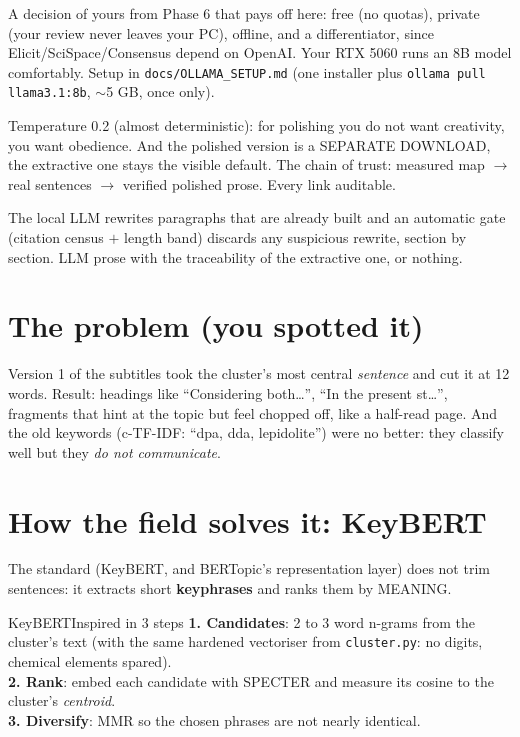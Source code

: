 \documentclass[11pt,a4paper]{article}
\begin{document}
A decision of yours from Phase 6 that pays off here: free (no quotas), private (your review
never leaves your PC), offline, and a differentiator, since Elicit/SciSpace/Consensus depend on
OpenAI. Your RTX 5060 runs an 8B model comfortably. Setup in
\texttt{docs/OLLAMA\_SETUP.md} (one installer plus \texttt{ollama pull llama3.1:8b},
$\sim$5 GB, once only).

\begin{ojo}
Temperature 0.2 (almost deterministic): for polishing you do not want creativity, you want
obedience. And the polished version is a SEPARATE DOWNLOAD, the extractive one stays the
visible default. The chain of trust: measured map $\rightarrow$ real sentences $\rightarrow$
verified polished prose. Every link auditable.
\end{ojo}

\begin{resumen}
The local LLM rewrites paragraphs that are already built and an automatic gate (citation census
$+$ length band) discards any suspicious rewrite, section by section. LLM prose with the
traceability of the extractive one, or nothing.
\end{resumen}
\clearpage
{}
{}

\section{The problem (you spotted it)}

Version 1 of the subtitles took the cluster's most central \emph{sentence} and cut it at 12
words. Result: headings like ``Considering both\ldots'', ``In the present st\ldots'',
fragments that hint at the topic but feel chopped off, like a half-read page. And the old
keywords (c-TF-IDF: ``dpa, dda, lepidolite'') were no better: they classify well but they
\emph{do not communicate}.

\section{How the field solves it: KeyBERT}

The standard (KeyBERT, and BERTopic's representation layer) does not trim sentences: it
extracts short \textbf{keyphrases} and ranks them by MEANING.

\begin{concepto}{KeyBERTInspired in 3 steps}
\textbf{1. Candidates}: 2 to 3 word n-grams from the cluster's text (with the same hardened
vectoriser from \texttt{cluster.py}: no digits, chemical elements spared). \\
\textbf{2. Rank}: embed each candidate with SPECTER and measure its cosine to the cluster's
\emph{centroid}. \\
\textbf{3. Diversify}: MMR so the chosen phrases are not nearly identical.
\end{concepto}
\end{document}
